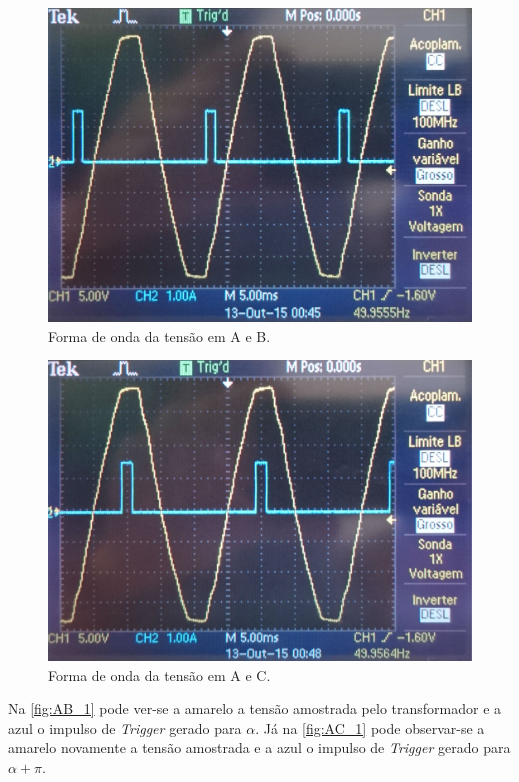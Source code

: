 \documentclass[a4paper,11pt]{article}
\numberwithin{equation}{section}
\begin{document}
\begin{figure}[h]
	\centering
	\includegraphics[keepaspectratio=true, scale=0.11]{img/figs/AB_1}
	\caption{Forma de onda da tensão em A e B.}
	\label{fig:AB_1}
	\vspace{-0.8em}
\end{figure}

\begin{figure}[h]
	\centering
	\includegraphics[keepaspectratio=true, scale=0.1]{img/figs/AC_1}
	\caption{Forma de onda da tensão em A e C.}
	\label{fig:AC_1}
	\vspace{-0.8em}
\end{figure}

Na \autoref{fig:AB_1} pode ver-se a amarelo a tensão amostrada pelo transformador e a azul o impulso de \textit{Trigger} gerado para $\alpha$. Já na \autoref{fig:AC_1} pode observar-se a amarelo novamente a tensão amostrada e a azul o impulso de \textit{Trigger} gerado para $\alpha + \pi$.
\end{document}
